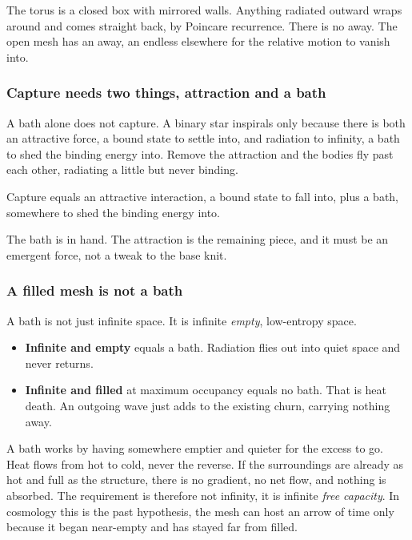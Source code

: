 The torus is a closed box with mirrored walls. Anything radiated outward wraps around and comes straight back, by Poincare recurrence. There is no away. The open mesh has an away, an endless elsewhere for the relative motion to vanish into.

\subsubsection{Capture needs two things, attraction and a bath}

A bath alone does not capture. A binary star inspirals only because there is both an attractive force, a bound state to settle into, and radiation to infinity, a bath to shed the binding energy into. Remove the attraction and the bodies fly past each other, radiating a little but never binding.

\begin{principle}
Capture equals an attractive interaction, a bound state to fall into, plus a bath, somewhere to shed the binding energy into.
\end{principle}

The bath is in hand. The attraction is the remaining piece, and it must be an emergent force, not a tweak to the base knit.

\subsubsection{A filled mesh is not a bath}

A bath is not just infinite space. It is infinite \emph{empty}, low-entropy space.

\begin{itemize}
\item \textbf{Infinite and empty} equals a bath. Radiation flies out into quiet space and never returns.
\item \textbf{Infinite and filled} at maximum occupancy equals no bath. That is heat death. An outgoing wave just adds to the existing churn, carrying nothing away.
\end{itemize}

A bath works by having somewhere emptier and quieter for the excess to go. Heat flows from hot to cold, never the reverse. If the surroundings are already as hot and full as the structure, there is no gradient, no net flow, and nothing is absorbed. The requirement is therefore not infinity, it is infinite \emph{free capacity}. In cosmology this is the past hypothesis, the mesh can host an arrow of time only because it began near-empty and has stayed far from filled.

